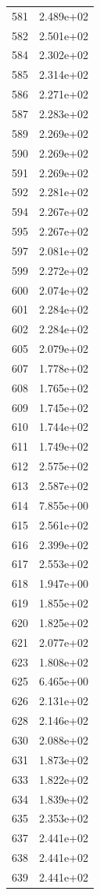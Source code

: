 \documentclass[12pt]{article}
\begin{document}
\begin{longtable}{@{}cc@{}}
581 & 2.489e+02 \\
582 & 2.501e+02 \\
584 & 2.302e+02 \\
585 & 2.314e+02 \\
586 & 2.271e+02 \\
587 & 2.283e+02 \\
589 & 2.269e+02 \\
590 & 2.269e+02 \\
591 & 2.269e+02 \\
592 & 2.281e+02 \\
594 & 2.267e+02 \\
595 & 2.267e+02 \\
597 & 2.081e+02 \\
599 & 2.272e+02 \\
600 & 2.074e+02 \\
601 & 2.284e+02 \\
602 & 2.284e+02 \\
605 & 2.079e+02 \\
607 & 1.778e+02 \\
608 & 1.765e+02 \\
609 & 1.745e+02 \\
610 & 1.744e+02 \\
611 & 1.749e+02 \\
612 & 2.575e+02 \\
613 & 2.587e+02 \\
614 & 7.855e+00 \\
615 & 2.561e+02 \\
616 & 2.399e+02 \\
617 & 2.553e+02 \\
618 & 1.947e+00 \\
619 & 1.855e+02 \\
620 & 1.825e+02 \\
621 & 2.077e+02 \\
623 & 1.808e+02 \\
625 & 6.465e+00 \\
626 & 2.131e+02 \\
628 & 2.146e+02 \\
630 & 2.088e+02 \\
631 & 1.873e+02 \\
633 & 1.822e+02 \\
634 & 1.839e+02 \\
635 & 2.353e+02 \\
637 & 2.441e+02 \\
638 & 2.441e+02 \\
639 & 2.441e+02 \\

\end{longtable}
\end{document}
